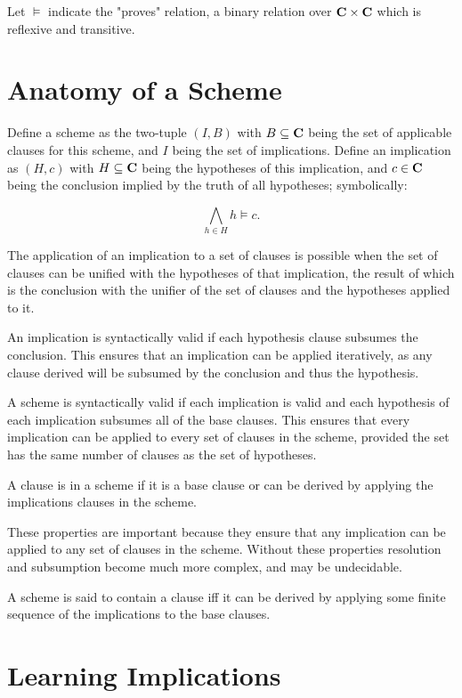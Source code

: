 \documentclass{article}
\newcommand{\allclauses}[0]{{\bf C}}
\begin{document}
Let $\models$ indicate the "proves" relation, a binary relation over $\allclauses \times \allclauses$ which is reflexive and transitive.

\section{Anatomy of a Scheme}

Define a scheme as the two-tuple $(I, B)$ with $B \subseteq \allclauses$ being the set of applicable clauses for this scheme, and $I$ being the set of implications. Define an implication as $(H, c)$ with $H \subseteq \allclauses$ being the hypotheses of this implication, and $c \in \allclauses$ being the conclusion implied by the truth of all hypotheses; symbolically:

$$
\bigwedge_{h \in H} h \models c.
$$

The application of an implication to a set of clauses is possible when the set of clauses can be unified with the hypotheses of that implication,
the result of which is the conclusion with the unifier of the set of clauses and the hypotheses applied to it.


An implication is syntactically valid if each hypothesis clause subsumes the conclusion.
This ensures that an implication can be applied iteratively, as any clause derived will be subsumed by the conclusion and thus the hypothesis.


A scheme is syntactically valid if each implication is valid and
each hypothesis of each implication subsumes all of the base clauses.
This ensures that every implication can be applied to every set of clauses in the scheme,
provided the set has the same number of clauses as the set of hypotheses.

A clause is in a scheme if it is a base clause or can be derived by applying the implications clauses in the scheme.

These properties are important because they ensure that any implication can be applied to any set of clauses in the scheme.
Without these properties resolution and subsumption become much more complex, and may be undecidable.

A scheme is said to contain a clause iff it can be derived by applying some finite sequence of the 
implications to the base clauses.

\section{Learning Implications}
\end{document}
